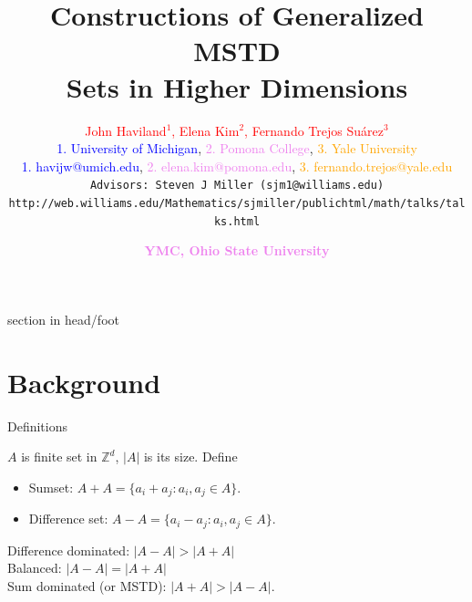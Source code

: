 \documentclass[11pt]{beamer}
\title[Constructions of Generalized MSTD Sets in Higher Dimensions]
{
Constructions of Generalized MSTD \\ Sets in Higher Dimensions
}
\author[JH, EK, FTS] %
 {
  \textcolor{red}{John Haviland$^1$, Elena Kim$^2$, Fernando Trejos Suárez$^3$}\\
  \smallskip
  \tiny
  \textcolor{blue}{1. University of Michigan}, \textcolor{violet}{2. Pomona College}, \textcolor{orange}{3. Yale University} 
  \\
  \smallskip
  \tiny
  \textcolor{blue}{1. havijw@umich.edu}, \textcolor{violet}{2. elena.kim@pomona.edu}, \textcolor{orange}{3. fernando.trejos@yale.edu}\normalsize\\
  \Bigskip
  \texttt{Advisors: Steven J Miller (sjm1@williams.edu)}\\
  \texttt{\tiny http://web.williams.edu/Mathematics/sjmiller/public\textunderscore html/math/talks/talks.html\normalsize}
}
\date[August 2020]
{\textcolor{violet}{\textbf{YMC, Ohio State University}}
}
\newcommand{\Z}{\mathbb{Z}}
\newcommand{\Bigskip}{\bigskip
\medskip}
\begin{document}

{%
\begin{beamercolorbox}{section in head/foot}
\insertpagenumber
\end{beamercolorbox}%
}

\begin{frame}
  \titlepage 
\end{frame}


\large

\section{Background} %

\begin{frame}{Definitions}

$A$ is finite set in $\Z^d$, $|A|$ is its size. \pause Define

\Bigskip

\begin{itemize}
\item Sumset: $A+A = \{a_i + a_j: a_i, a_j \in A\}$.
\item Difference set: $A-A = \{a_i - a_j: a_i, a_j \in A\}$.
\end{itemize}

\pause
\bigskip

\begin{definition}
\alert{Difference dominated}: $|A-A| > |A+A|$ \\
\alert{Balanced}: $|A-A| = |A+A|$ \\
\alert{Sum dominated (or MSTD)}: $|A+A| > |A-A|$.
\end{definition}

\end{frame}
\end{document}
